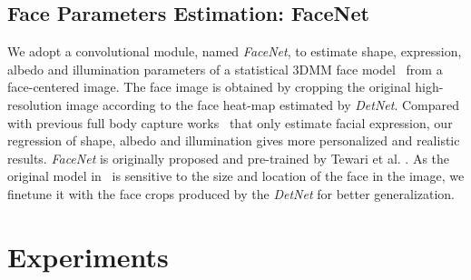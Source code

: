 \documentclass[final]{cvpr}
\begin{document}
 \subsection{Face Parameters Estimation: FaceNet}
\label{sec:FaceNet}
We adopt a convolutional module, named \textit{FaceNet}, to estimate shape, expression, albedo and illumination parameters of a statistical 3DMM face model~\cite{blanz1999a} from a face-centered image.
The face image is obtained by cropping the original high-resolution image according to the face heat-map estimated by \textit{DetNet}.
Compared with previous full body capture works~\cite{xiang2019monocular,pavlakos2019expressive,joo2018total,choutas2020monocular} that only estimate facial expression, our regression of shape, albedo and illumination gives more personalized and realistic results.
\textit{FaceNet} is originally proposed and pre-trained by Tewari et al. \cite{tewari2017mofa}.
As the original model in~\cite{tewari2017mofa} is sensitive to the size and location of the face in the image, we finetune it with the face crops produced by the \textit{DetNet} for better generalization.
  \section{Experiments}
\end{document}
